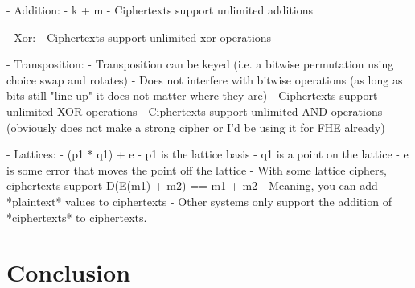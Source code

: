 \documentclass[preprint]{iacrtrans}
\begin{document}
- Addition:
    - k + m
    - Ciphertexts support unlimited additions
    
- Xor:
    - Ciphertexts support unlimited xor operations
    
- Transposition:
    - Transposition can be keyed (i.e. a bitwise permutation using choice swap and rotates)
    - Does not interfere with bitwise operations (as long as bits still "line up" it does not matter where they are)
    - Ciphertexts support unlimited XOR operations
    - Ciphertexts support unlimited AND operations
    - (obviously does not make a strong cipher or I'd be using it for FHE already)
    
- Lattices:
    - (p1 * q1) + e
    - p1 is the lattice basis
    - q1 is a point on the lattice
    - e is some error that moves the point off the lattice
    - With some lattice ciphers, ciphertexts support D(E(m1) + m2) == m1 + m2
        - Meaning, you can add *plaintext* values to ciphertexts
            - Other systems only support the addition of *ciphertexts* to ciphertexts.
            
\section{Conclusion}
\end{document}
